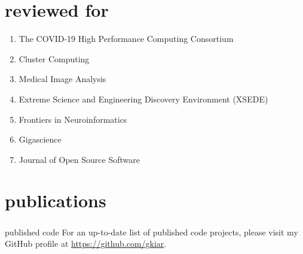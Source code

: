 \documentclass[]{friggeri-cv} %
\begin{document}

\section{reviewed for}
\begin{enumerate}
\item The COVID-19 High Performance Computing Consortium
\item Cluster Computing
\item Medical Image Analysis
\item Extreme Science and Engineering Discovery Environment (XSEDE)
\item Frontiers in Neuroinformatics
\item Gigascience
\item Journal of Open Source Software
\end{enumerate}

\clearpage

\section{publications}







\subsubsection{}{published code}
For an up-to-date list of published code projects, please visit my GitHub profile at
\href{https://github.com/gkiar}{https://github.com/gkiar}.

\end{document}
